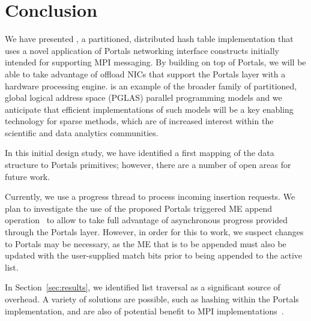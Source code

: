 \section{Conclusion}

We have presented \pdht, a partitioned, distributed hash table implementation
that uses a novel application of Portals networking interface constructs
initially intended for supporting MPI messaging.  By building \pdht on top of
Portals, we will be able to take advantage of offload NICs that support the
Portals layer with a hardware processing engine.  \pdht is an example of the
broader family of partitioned, global logical address space (PGLAS) parallel
programming models and we anticipate that efficient implementations of such
models will be a key enabling technology for sparse methods, which are of
increased interest within the scientific and data analytics communities.

In this initial design study, we have identified a first mapping of the \pdht
data structure to Portals primitives; however, there are a number of open areas
for future work.

Currently, we use a progress thread to process incoming insertion requests.  We
plan to investigate the use of the proposed Portals triggered ME append
operation~\cite{schneider:13} to allow \pdht to take full advantage of
asynchronous progress provided through the Portals layer.  However, in order
for this to work, we suspect changes to Portals may be necessary, as the ME
that is to be appended must also be updated with the user-supplied match bits
prior to being appended to the active list.

In Section~\ref{sec:results}, we identified list traversal as a significant
source of overhead.  A variety of solutions are possible, such as hashing
within the Portals implementation, and are also of potential benefit to MPI
implementations~\cite{flajslik:16}.

